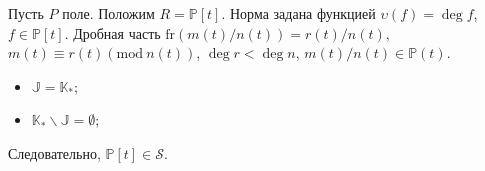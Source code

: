 \documentclass[_00_dissertation.tex]{subfiles}
\begin{document}
\begin{example}\label{example:P[t]}
    Пусть $P$ поле.
    Положим $R = \mathbb{P}[t]$.
    Норма задана функцией $\upsilon(f)=\deg f$, $f \in \mathbb{P}[t]$.
    Дробная часть $\textrm{fr}(m(t)/n(t))=r(t)/n(t)$, $m(t)\equiv r(t)(\textrm{mod}\ n(t))$, $\deg r < \deg n$, $m(t)/n(t) \in \mathbb{P}(t).$

    \begin{itemize}
        \item $\mathbb{J}=\mathbb{K}_{*}$;

        \item $\mathbb{K}_{*}\backslash\mathbb{J} = \emptyset$;
    \end{itemize}

    Следовательно, $\mathbb{P}[t] \in \mathcal{S}$.
\end{example}
\end{document}
